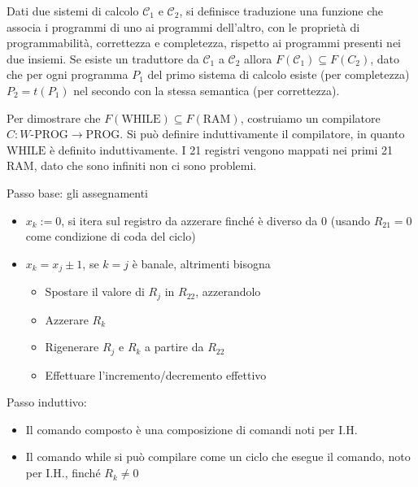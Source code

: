 \documentclass[12pt, answers]{exam}
\theoremstyle{plain}
\newcommand{\prog}{\text{PROG}}
\newcommand{\ram}{\text{RAM}}
\newcommand{\while}{\text{WHILE}}
\newcommand{\wprog}{W\text{-PROG}}
\newcommand{\C}{\mathcal{C}}
\begin{document}
\begin{questions}
\begin{solution}
            Dati due sistemi di calcolo $\C_1$ e $\C_2$, si definisce traduzione una funzione che associa i programmi di uno ai programmi dell'altro, con le proprietà di programmabilità, correttezza e completezza, rispetto ai programmi presenti nei due insiemi. Se esiste un traduttore da $\C_1$ a $\C_2$ allora $F(\C_1) \subseteq F(C_2)$, dato che per ogni programma $P_1$ del primo sistema di calcolo esiste (per completezza) $P_2 = t(P_1)$ nel secondo con la stessa semantica (per correttezza).
            
            Per dimostrare che $F(\while) \subseteq F(\ram)$, costruiamo un compilatore $C: \wprog \rightarrow \prog$. Si può definire induttivamente il compilatore, in quanto $\while$ è definito induttivamente. I 21 registri vengono mappati nei primi 21 $\ram$, dato che sono infiniti non ci sono problemi.
            
            Passo base: gli assegnamenti
            \begin{itemize}
                \item $x_k := 0$, si itera sul registro da azzerare finché è diverso da 0 (usando $R_{21} = 0$ come condizione di coda del ciclo)
                
                \item $x_k = x_j \pm 1$, se $k = j$ è banale, altrimenti bisogna
                \begin{itemize}
                    \item Spostare il valore di $R_j$ in $R_{22}$, azzerandolo
                    
                    \item Azzerare $R_k$
                    
                    \item Rigenerare $R_j$ e $R_k$ a partire da $R_{22}$
                    
                    \item Effettuare l'incremento/decremento effettivo
                \end{itemize}
            \end{itemize}
            
            Passo induttivo: 
            \begin{itemize}
                \item Il comando composto è una composizione di comandi noti per I.H.
                
                \item Il comando while si può compilare come un ciclo che esegue il comando, noto per I.H., finché $R_k \neq 0$
            \end{itemize}
            

\end{solution}
\end{questions}
\end{document}
